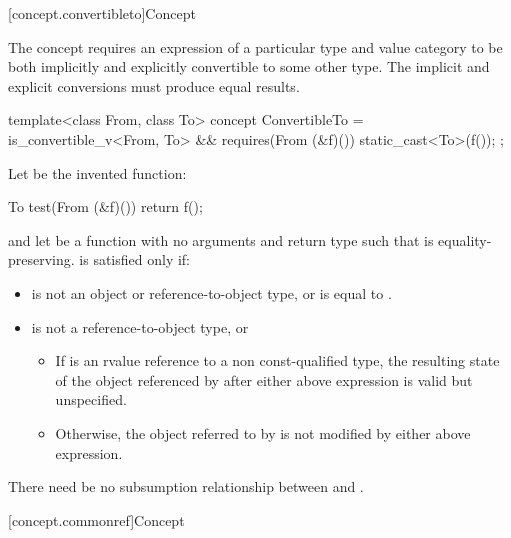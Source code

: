 [concept.convertibleto]{Concept }

\pnum
The  concept requires an expression of a particular
type and value category to be both implicitly and explicitly convertible to some
other type. The implicit and explicit conversions must produce equal results.

%
\begin{itemdecl}
template<class From, class To>
concept ConvertibleTo = is_convertible_v<From, To> &&
  requires(From (&f)()) { static_cast<To>(f()); };
\end{itemdecl}

\begin{itemdescr}
\pnum
Let  be the invented function:
\begin{codeblock}
To test(From (&f)()) {
  return f();
}
\end{codeblock}
and let  be a function with no arguments and return type 
such that  is equality-preserving.
 is satisfied only if:

\begin{itemize}
\item
{} is not an object or reference-to-object type, or
 is equal to .

\item
{} is not a reference-to-object type, or

\begin{itemize}
\item
If  is an rvalue reference to a non const-qualified type, the
resulting state of the object referenced by  after either above
expression is valid but unspecified.

\item
Otherwise, the object referred to by  is not modified by either above
expression.
\end{itemize}

\end{itemize}

\pnum
There need be no subsumption relationship between
and
.
\end{itemdescr}


[concept.commonref]{Concept }

